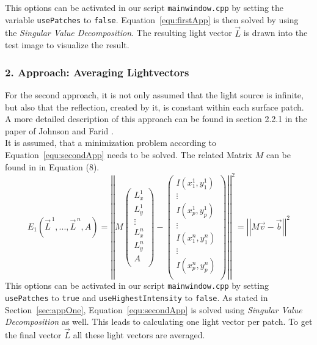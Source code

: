 This options can be activated in our script \texttt{mainwindow.cpp} by setting the variable \texttt{usePatches} to \texttt{false}. Equation~\ref{equ:firstApp} is then solved by using the \textit{Singular Value Decomposition}. The resulting light vector $\vec{L}$ is drawn into the test image to visualize the result.  

\subsubsection{2. Approach: Averaging Lightvectors}\label{sec:appTwo}

For the second approach, it is not only assumed that the light source is infinite, but also that the reflection, created by it, is constant within each surface patch. A more detailed description of this approach can be found in section 2.2.1 in the paper of Johnson and Farid \cite{Johnson}.\\
It is assumed, that a minimization problem according to Equation~\ref{equ:secondApp} needs to be solved. The related Matrix $M$ can be found in \cite{Johnson} in Equation (8). \\

\begin{equation}
\label{equ:secondApp}
E_{1}(\vec{L}^{\,1} , ... , \vec{L}^{\,n} , A) = 
\left\vert \left\vert 
M
\begin{pmatrix}
L^{1}_{x} \\
L^{1}_{y} \\
\vdots  \\
L^{n}_{x} \\
L^{n}_{y} \\
A \\
\end{pmatrix} -
\begin{pmatrix}
I(x^{1}_{1} , y^{1}_{1}) \\
\vdots  \\
I(x^{1}_{p} , y^{1}_{p}) \\
\vdots  \\
I(x^{n}_{1} , y^{n}_{1}) \\
\vdots  \\
I(x^{n}_{p} , y^{n}_{p}) \\
\end{pmatrix}
 \right\vert\right\vert^{2}
 = \left\vert \left\vert  M\vec{v}-\vec{b}  \right\vert\right\vert^{2}
\end{equation}
This options can be activated in our script \texttt{mainwindow.cpp} by setting \texttt{usePatches} to \texttt{true} and \texttt{useHighestIntensity} to \texttt{false}.
As stated in Section~\ref{sec:appOne}, Equation~\ref{equ:secondApp} is solved using \textit{Singular Value Decomposition} as well. This leads to calculating one light vector per patch. To get the final vector $\vec{L}$ all these light vectors are averaged.


